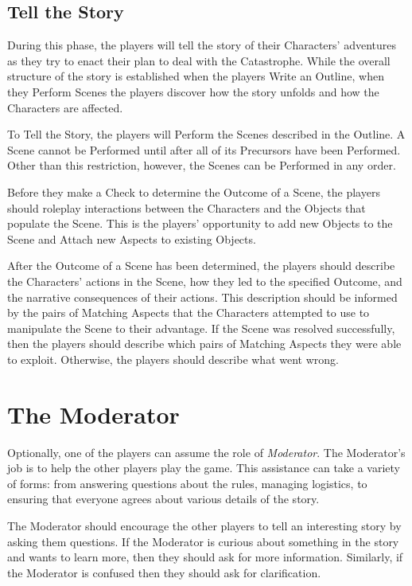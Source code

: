 \documentclass[12pt, a5paper, parskip=half-]{scrartcl}
\begin{document}
\newpage

\subsection*{Tell the Story}
During this phase, the players will tell the story of their Characters' adventures as they try to enact their plan to deal with the Catastrophe.
While the overall structure of the story is established when the players Write an Outline, when they Perform Scenes the players discover how the story unfolds and how the Characters are affected.

To Tell the Story, the players will Perform the Scenes described in the Outline.
A Scene cannot be Performed until after all of its Precursors have been Performed. Other than this restriction, however, the Scenes can be Performed in any order.

Before they make a Check to determine the Outcome of a Scene, the players should roleplay interactions between the Characters and the Objects that populate the Scene.
This is the players' opportunity to add new Objects to the Scene and Attach new Aspects to existing Objects.

After the Outcome of a Scene has been determined, the players should describe the Characters' actions in the Scene, how they led to the specified Outcome, and the narrative consequences of their actions.
This description should be informed by the pairs of Matching Aspects that the Characters attempted to use to manipulate the Scene to their advantage.
If the Scene was resolved successfully, then the players should describe which pairs of Matching Aspects they were able to exploit.
Otherwise, the players should describe what went wrong.

\newpage

\section*{The Moderator}
Optionally, one of the players can assume the role of \emph{Moderator}. The Moderator's job is to help the other players play the game. This assistance can take a variety of forms: from answering questions about the rules, managing logistics,  to ensuring that everyone agrees about various details of the story.

The Moderator should encourage the other players to tell an interesting story by asking them questions.  If the Moderator is curious about something in the story and wants to learn more,  then they should ask for more information.  Similarly, if the Moderator is confused then they should ask for clarification.
\end{document}
